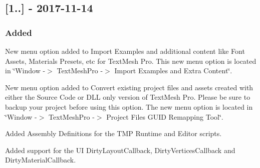 \subsection*{\mbox{[}1..\mbox{]} -\/ 2017-\/11-\/14}

\subsubsection*{Added}


\begin{DoxyItemize}
\item New menu option added to Import Examples and additional content like Font Assets, Materials Presets, etc for Text\+Mesh Pro. This new menu option is located in \char`\"{}\+Window -\/$>$ Text\+Mesh\+Pro -\/$>$ Import Examples and Extra Content\char`\"{}.
\item New menu option added to Convert existing project files and assets created with either the Source Code or D\+LL only version of Text\+Mesh Pro. Please be sure to backup your project before using this option. The new menu option is located in \char`\"{}\+Window -\/$>$ Text\+Mesh\+Pro -\/$>$ Project Files G\+U\+I\+D Remapping Tool\char`\"{}.
\item Added Assembly Definitions for the T\+MP Runtime and Editor scripts.
\item Added support for the UI Dirty\+Layout\+Callback, Dirty\+Vertices\+Callback and Dirty\+Material\+Callback. 
\end{DoxyItemize}